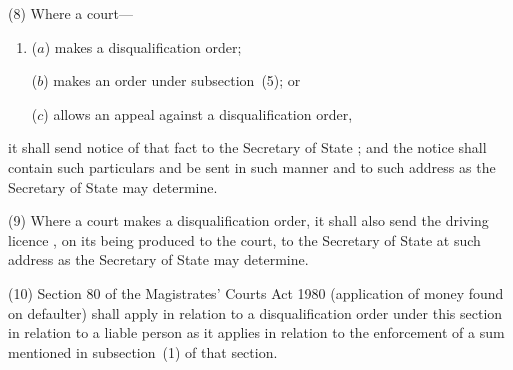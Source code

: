 \documentclass[12pt,a4paper]{article}
\begin{document}
(8) Where a court—
\begin{enumerate}\item[]
($a$) makes a disqualification order;

($b$) makes an order under subsection~(5); or

($c$) allows an appeal against a disqualification order,
\end{enumerate}
it shall send notice of that fact to the 
Secretary of State%
; and the notice shall contain such particulars and be sent in such manner and to such address as the 
Secretary of State  %
may determine.

(9) Where a court makes a disqualification order, it shall also send the driving licence%
, on 
its  %
being produced to the court, to the 
Secretary of State  %
at such address as 
the Secretary of State  %
may determine.

(10) Section 80 of the Magistrates' Courts Act 1980 (application of money found on defaulter) shall apply in relation to a disqualification order under this section in relation to a liable person as it applies in relation to the enforcement of a sum mentioned in subsection~(1)  of that section.

%
%
%
\end{document}
